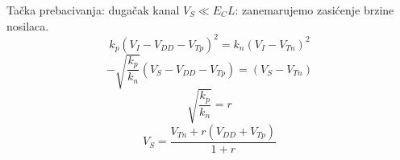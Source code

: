 \begin{frame}[label=09_2-s039]{Tačka prebacivanja: dugačak kanal}
$V_S\ll E_CL$: zanemarujemo zasićenje brzine nosilaca.\[k_p(V_I-V_{DD}-V_{Tp})^2=k_n(V_I-V_{Tn})^2\]
\[-\sqrt{\frac{k_p}{k_n}}(V_S-V_{DD}-V_{Tp})=(V_S-V_{Tn})\]
\[\sqrt{\frac{k_p}{k_n}}=r\]
\[V_S=\frac{V_{Tn}+r(V_{DD}+V_{Tp})}{1+r}\]

\end{frame}
